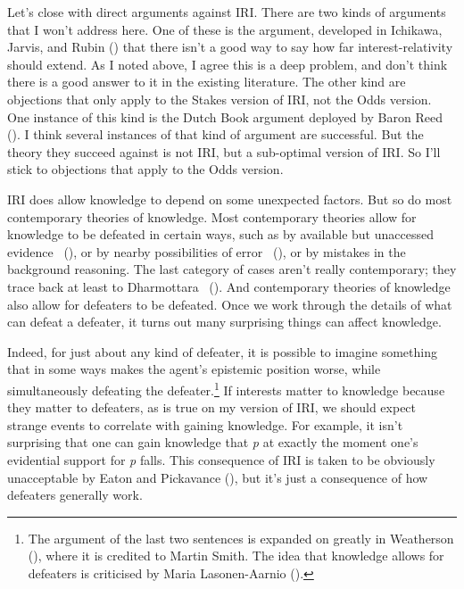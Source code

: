 \documentclass[
  11pt,
  letterpaper,
  DIV=11,
  numbers=noendperiod,
  twoside]{scrartcl}
\begin{document}
Let's close with direct arguments against IRI. There are two kinds of
arguments that I won't address here. One of these is the argument,
developed in Ichikawa, Jarvis, and Rubin
() that there isn't a good way to
say how far interest-relativity should extend. As I noted above, I agree
this is a deep problem, and don't think there is a good answer to it in
the existing literature. The other kind are objections that only apply
to the Stakes version of IRI, not the Odds version. One instance of this
kind is the Dutch Book argument deployed by Baron Reed
(). I think several instances of that kind
of argument are successful. But the theory they succeed against is not
IRI, but a sub-optimal version of IRI. So I'll stick to objections that
apply to the Odds version.

IRI does allow knowledge to depend on some unexpected factors. But so do
most contemporary theories of knowledge. Most contemporary theories
allow for knowledge to be defeated in certain ways, such as by available
but unaccessed evidence ~(),
or by nearby possibilities of error ~(), or by mistakes in the background reasoning. The last category of
cases aren't really contemporary; they trace back at least to
Dharmottara ~(). And
contemporary theories of knowledge also allow for defeaters to be
defeated. Once we work through the details of what can defeat a
defeater, it turns out many surprising things can affect knowledge.

Indeed, for just about any kind of defeater, it is possible to imagine
something that in some ways makes the agent's epistemic position worse,
while simultaneously defeating the defeater.\footnote{The argument of
  the last two sentences is expanded on greatly in Weatherson
  (), where it is
  credited to Martin Smith. The idea that knowledge allows for defeaters
  is criticised by Maria Lasonen-Aarnio
  ().} If interests matter to
knowledge because they matter to defeaters, as is true on my version of
IRI, we should expect strange events to correlate with gaining
knowledge. For example, it isn't surprising that one can gain knowledge
that \emph{p} at exactly the moment one's evidential support for
\emph{p} falls. This consequence of IRI is taken to be obviously
unacceptable by Eaton and Pickavance
(), but it's just a consequence
of how defeaters generally work.
\end{document}
